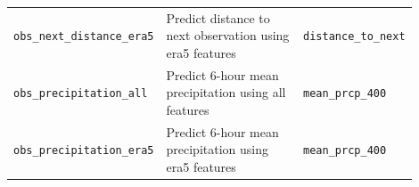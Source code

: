 {\begin{longtable}{>{\raggedright\arraybackslash}p{0.27\linewidth} p{0.43\linewidth} >{\raggedright\arraybackslash}p{0.20\linewidth}}
    \texttt{obs\_next\_distance\_era5} & Predict distance to next observation using \acrshort{era5} features & \texttt{distance\_to\_next} \\
    \texttt{obs\_precipitation\_all} & Predict 6-hour mean precipitation using all features & \texttt{mean\_prcp\_400} \\
    \texttt{obs\_precipitation\_era5} & Predict 6-hour mean precipitation using \acrshort{era5} features & \texttt{mean\_prcp\_400} \\
\end{longtable}
}